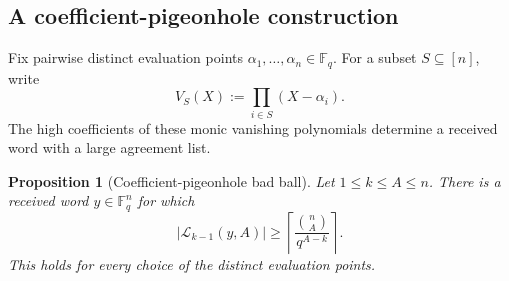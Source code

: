 \documentclass[11pt,letterpaper]{article}
\newtheorem{proposition}[proposition]{Proposition}
\theoremstyle{definition}
\newcommand{\F}{\mathbb{F}}
\newcommand{\List}{\mathcal{L}}
\begin{document}
\subsection{A coefficient-pigeonhole construction}

Fix pairwise distinct evaluation points
\(\alpha_1,\ldots,\alpha_n\in\F_q\).  For a subset \(S\subseteq[n]\), write
\begin{equation}
  V_S(X):=\prod_{i\in S}(X-\alpha_i).
  \label{eq:subset-vanishing-polynomial}
\end{equation}
The high coefficients of these monic vanishing polynomials determine a
received word with a large agreement list.

\begin{proposition}[Coefficient-pigeonhole bad ball]
\label{prop:coefficient-pigeonhole}
Let \(1\leq k\leq A\leq n\).  There is a received word
\(y\in\F_q^n\) for which
\begin{equation}
  \bigl|\List_{k-1}(y,A)\bigr|
  \geq
  \left\lceil\frac{\binom{n}{A}}{q^{A-k}}\right\rceil.
  \label{eq:coefficient-pigeonhole-bound}
\end{equation}
This holds for every choice of the distinct evaluation points.
\end{proposition}
\end{document}
